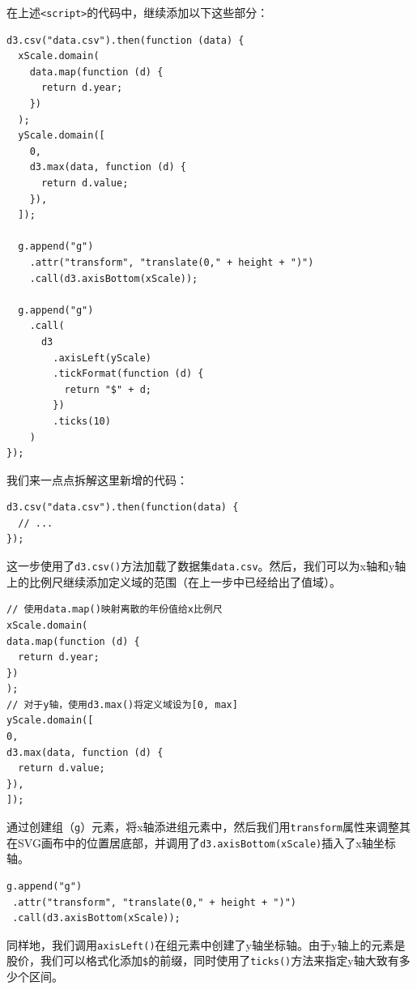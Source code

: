 在上述\verb|<script>|的代码中，继续添加以下这些部分：

\begin{verbatim}
d3.csv("data.csv").then(function (data) {
  xScale.domain(
    data.map(function (d) {
      return d.year;
    })
  );
  yScale.domain([
    0,
    d3.max(data, function (d) {
      return d.value;
    }),
  ]);

  g.append("g")
    .attr("transform", "translate(0," + height + ")")
    .call(d3.axisBottom(xScale));

  g.append("g")
    .call(
      d3
        .axisLeft(yScale)
        .tickFormat(function (d) {
          return "$" + d;
        })
        .ticks(10)
    )
});
\end{verbatim}

我们来一点点拆解这里新增的代码：

\begin{verbatim}
d3.csv("data.csv").then(function(data) {
  // ...
});
\end{verbatim}

这一步使用了\verb|d3.csv()|方法加载了数据集\verb|data.csv|。然后，我们可以为x轴和y轴上的比例尺继续添加定义域的范围（在上一步中已经给出了值域）。

\begin{verbatim}
// 使用data.map()映射离散的年份值给x比例尺
xScale.domain(
data.map(function (d) {
  return d.year;
})
);
// 对于y轴，使用d3.max()将定义域设为[0, max]
yScale.domain([
0,
d3.max(data, function (d) {
  return d.value;
}),
]);
\end{verbatim}

通过创建组（\verb|g|）元素，将x轴添进组元素中，然后我们用\verb|transform|属性来调整其在SVG画布中的位置居底部，并调用了\verb|d3.axisBottom(xScale)|插入了x轴坐标轴。

\begin{verbatim}
g.append("g")
 .attr("transform", "translate(0," + height + ")")
 .call(d3.axisBottom(xScale));
\end{verbatim}

同样地，我们调用\verb|axisLeft()|在组元素中创建了y轴坐标轴。由于y轴上的元素是股价，我们可以格式化添加\verb|$|的前缀，同时使用了\verb|ticks()|方法来指定y轴大致有多少个区间。

